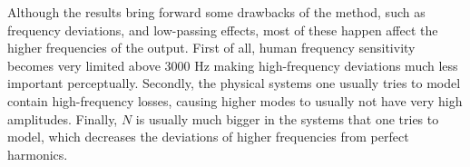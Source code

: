 Although the results bring forward some drawbacks of the method, such as frequency deviations, and low-passing effects, most of these happen affect the higher frequencies of the output. First of all, human frequency sensitivity becomes very limited above 3000 Hz \cite{Zwicker1990} making high-frequency deviations much less important perceptually. Secondly, the physical systems one usually tries to model contain high-frequency losses, causing higher modes to usually not have very high amplitudes. Finally, $N$ is usually much bigger in the systems that one tries to model, which decreases the deviations of higher frequencies from perfect harmonics. 

